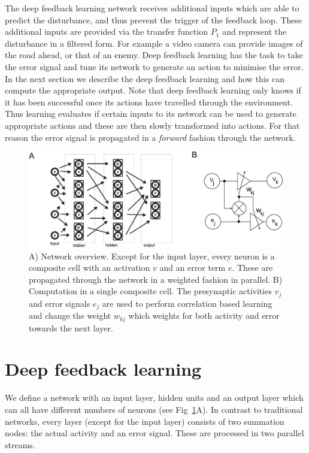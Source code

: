 \documentclass{llncs}
\begin{document}
The deep feedback learning network receives additional inputs which are able
to predict the disturbance, and thus prevent the trigger of the feedback
loop. These additional inputs are provided via the transfer function $P_1$
and represent the disturbance in a filtered form. For example a video camera
can provide images of the road ahead, or that of an enemy. Deep feedback
learning has the task to take the error signal and tune its network
to generate an action to minimise the error. In the next section
we describe the deep feedback learning and how this can
compute the appropriate output. Note that deep feedback learning only knows if it has been
successful once its actions have travelled through the environment. Thus learning
evaluates if certain inputs to its network can be used to generate
appropriate actions and these are then slowly transformed into actions.
For that reason the error signal is propagated in a \textsl{forward} fashion
through the network.

\begin{figure}[h!]
  \centering
  \includegraphics[width=\columnwidth]{netw_together}
  \caption{A) Network overview. Except for the input layer, every
    neuron is a composite cell with an activation $v$ and an error
    term $e$. These are propagated through the network in a weighted
    fashion in parallel.  B) Computation in a single composite cell.
    The presynaptic activities $v_j$ and error signals $e_j$ are used
    to perform correlation based learning and change the weight
    $w_{kj}$ which weights for both activity and error towards the next
    layer.\label{netw_together}}
\end{figure}


\section{Deep feedback learning}
We define a network with an input layer, hidden units and an output
layer which can all have different numbers of neurons (see
Fig~\ref{netw_together}A). In contrast to traditional
networks, every layer (except for the input layer) consists of two
summation nodes: the actual activity and an error signal. These
are processed in two parallel streams.
\end{document}
